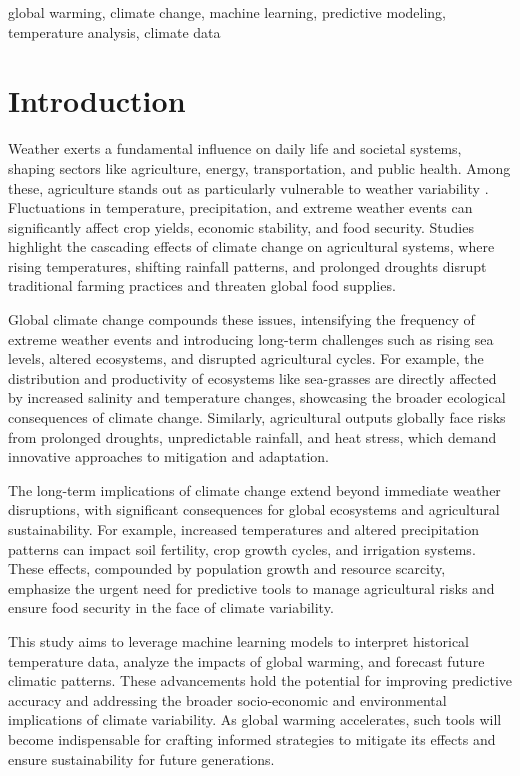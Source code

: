 \documentclass[conference]{IEEEtran}
\begin{document}
\begin{IEEEkeywords}
global warming, climate change, machine learning, predictive modeling, temperature analysis, climate data
\end{IEEEkeywords}

\section{Introduction}
Weather exerts a fundamental influence on daily life and societal systems, shaping sectors like agriculture, energy, transportation, and public health. Among these, agriculture stands out as particularly vulnerable to weather variability\cite{b1} \cite{b2}. Fluctuations in temperature, precipitation, and extreme weather events can significantly affect crop yields, economic stability, and food security. Studies highlight the cascading effects of climate change on agricultural systems, where rising temperatures, shifting rainfall patterns, and prolonged droughts disrupt traditional farming practices and threaten global food supplies\cite{b3}.

Global climate change compounds these issues, intensifying the frequency of extreme weather events and introducing long-term challenges such as rising sea levels, altered ecosystems, and disrupted agricultural cycles. For example, the distribution and productivity of ecosystems like sea-grasses are directly affected by increased salinity and temperature changes, showcasing the broader ecological consequences of climate change\cite{b4}. Similarly, agricultural outputs globally face risks from prolonged droughts, unpredictable rainfall, and heat stress, which demand innovative approaches to mitigation and adaptation\cite{b2}.

The long-term implications of climate change extend beyond immediate weather disruptions, with significant consequences for global ecosystems and agricultural sustainability. For example, increased temperatures and altered precipitation patterns can impact soil fertility, crop growth cycles, and irrigation systems\cite{b1}\cite{b2}. These effects, compounded by population growth and resource scarcity, emphasize the urgent need for predictive tools to manage agricultural risks and ensure food security in the face of climate variability\cite{b5}.

This study aims to leverage machine learning models to interpret historical temperature data, analyze the impacts of global warming, and forecast future climatic patterns. These advancements hold the potential for improving predictive accuracy and addressing the broader socio-economic and environmental implications of climate variability. As global warming accelerates, such tools will become indispensable for crafting informed strategies to mitigate its effects and ensure sustainability for future generations.
\end{document}
